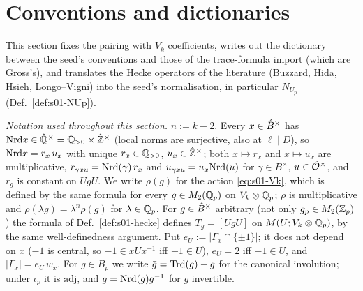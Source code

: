 \section{Conventions and dictionaries}

This section fixes the pairing with $V_k$ coefficients, writes out the dictionary between the seed's conventions and those of
the trace-formula import (which are Gross's), and translates the Hecke operators of the literature (Buzzard, Hida, Hsieh,
Longo--Vigni) into the seed's normalisation, in particular $N_{U_p}$ (Def.~\ref{def:s01-NUp}).

\emph{Notation used throughout this section.} $n:=k-2$. Every $x\in\hat{B}^\times$ has $\mathrm{Nrd} x\in\hat{\mathbb{Q}}^\times=\mathbb{Q}_{>0}\times\hat{\mathbb{Z}}^\times$
(local norms are surjective, also at $\ell\mid D$), so $\mathrm{Nrd} x=r_x\,u_x$ with unique $r_x\in\mathbb{Q}_{>0}$, $u_x\in\hat{\mathbb{Z}}^\times$; both
$x\mapsto r_x$ and $x\mapsto u_x$ are multiplicative, $r_{\gamma xu}=\mathrm{Nrd}(\gamma)\,r_x$ and $u_{\gamma xu}=u_x\mathrm{Nrd}(u)$ for
$\gamma\in B^\times$, $u\in\hat{\mathcal{O}}^\times$, and $r_g$ is constant on $UgU$. We write $\rho(g)$ for the action \eqref{eq:s01-Vk}, which is
defined by the same formula for every $g\in M_2(\mathbb{Q}_p)$ on $V_k\otimes\mathbb{Q}_p$; $\rho$ is multiplicative and $\rho(\lambda g)=\lambda^n\rho(g)$
for $\lambda\in\mathbb{Q}_p$. For $g\in\hat{B}^\times$ arbitrary (not only $g_p\in M_2(\mathbb{Z}_p)$) the formula of Def.~\ref{def:s01-hecke} defines
$T_g=[UgU]$ on $M(U;V_k\otimes\mathbb{Q}_p)$, by the same well-definedness argument. Put $e_U:=|\Gamma_x\cap\{\pm1\}|$; it does not
depend on $x$ ($-1$ is central, so $-1\in xUx^{-1}$ iff $-1\in U$), $e_U=2$ iff $-1\in U$, and $|\Gamma_x|=e_U\,w_x$.
For $g\in B_p$ we write $\bar g=\mathrm{Trd}(g)-g$ for the canonical involution; under $\iota_p$ it is $\mathrm{adj}$, and
$\bar g=\mathrm{Nrd}(g)g^{-1}$ for $g$ invertible.

